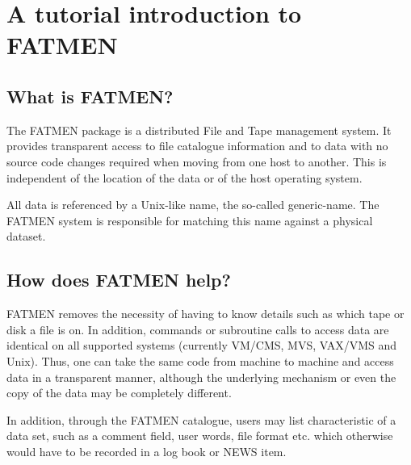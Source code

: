 
\chapter{A tutorial introduction to FATMEN}
\section{What is FATMEN?}

The FATMEN package is a distributed File and Tape management system.
It provides transparent access to file catalogue
information and to data with no source code changes required
when moving from one host to another. This is independent 
of the location of the data or of the host operating system.
\par
All data is referenced by a Unix-like name, the so-called generic-name.
The FATMEN system is responsible for matching this name against
a physical dataset.
\section{How does FATMEN help?}
\par
FATMEN removes the necessity of having to know details such as which
tape or disk a file is on. In addition, commands or subroutine calls to
access data are identical on all supported systems 
(currently VM/CMS, MVS, VAX/VMS and Unix). 
Thus, one can take the same code from machine to machine and access
data in a transparent manner, although the underlying mechanism
or even the copy of the data may be completely different.
\par
In addition, through the FATMEN catalogue, users may list characteristic
of a data set, such as a comment field, user words, file format etc.
which otherwise would have to be recorded in a log book or NEWS item.
